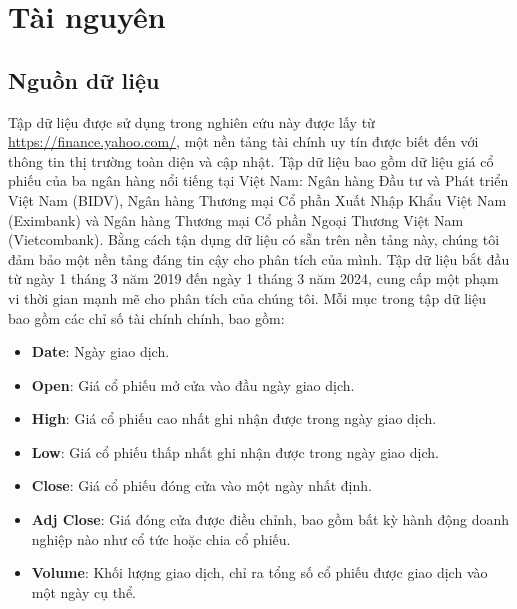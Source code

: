 \section{Tài nguyên}
\subsection{Nguồn dữ liệu}
Tập dữ liệu được sử dụng trong nghiên cứu này được lấy từ \underline{\url{https://finance.yahoo.com/}}, một nền tảng tài chính uy tín được biết đến với thông tin thị trường toàn diện và cập nhật. Tập dữ liệu bao gồm dữ liệu giá cổ phiếu của ba ngân hàng nổi tiếng tại Việt Nam: Ngân hàng Đầu tư và Phát triển Việt Nam (BIDV), Ngân hàng Thương mại Cổ phần Xuất Nhập Khẩu Việt Nam (Eximbank) và Ngân hàng Thương mại Cổ phần Ngoại Thương Việt Nam (Vietcombank). Bằng cách tận dụng dữ liệu có sẵn trên nền tảng này, chúng tôi đảm bảo một nền tảng đáng tin cậy cho phân tích của mình. Tập dữ liệu bắt đầu từ ngày 1 tháng 3 năm 2019 đến ngày 1 tháng 3 năm 2024, cung cấp một phạm vi thời gian mạnh mẽ cho phân tích của chúng tôi. Mỗi mục trong tập dữ liệu bao gồm các chỉ số tài chính chính, bao gồm:
\begin{itemize}
\item \textbf{Date}: Ngày giao dịch.
\item \textbf{Open}: Giá cổ phiếu mở cửa vào đầu ngày giao dịch.
\item \textbf{High}: Giá cổ phiếu cao nhất ghi nhận được trong ngày giao dịch.
\item \textbf{Low}: Giá cổ phiếu thấp nhất ghi nhận được trong ngày giao dịch.
\item \textbf{Close}: Giá cổ phiếu đóng cửa vào một ngày nhất định.
\item \textbf{Adj Close}: Giá đóng cửa được điều chỉnh, bao gồm bất kỳ hành động doanh nghiệp nào như cổ tức hoặc chia cổ phiếu.
\item \textbf{Volume}: Khối lượng giao dịch, chỉ ra tổng số cổ phiếu được giao dịch vào một ngày cụ thể.
\end{itemize}
